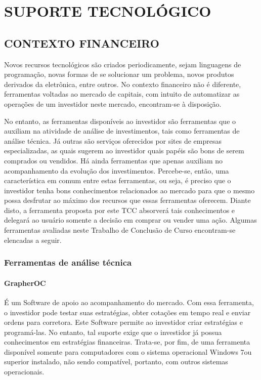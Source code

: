 \chapter[SUPORTE TECNOLOGICO]{SUPORTE TECNOLÓGICO}
\section{CONTEXTO FINANCEIRO}

Novos recursos tecnológicos são criados periodicamente, sejam linguagens de programação, novas formas de se solucionar um problema, novos produtos derivados da eletrônica, entre outros. No contexto financeiro não é diferente, ferramentas voltadas ao mercado de capitais, com intuito de automatizar as operações de um investidor neste mercado, encontram-se à disposição.

No entanto, as ferramentas disponíveis ao investidor são ferramentas que o auxiliam na atividade de análise de investimentos, tais como ferramentas de análise técnica. Já outras são serviços oferecidos por sites de empresas especializadas, as quais sugerem ao investidor quais papéis são bons de serem comprados ou vendidos. Há ainda ferramentas que apenas auxiliam no acompanhamento da evolução dos investimentos. Percebe-se, então, uma característica em comum entre estas ferramentas, ou seja, é preciso que o investidor tenha bons conhecimentos relacionados ao mercado para que o mesmo possa desfrutar ao máximo dos recursos que essas ferramentas oferecem. Diante disto, a ferramenta proposta por este TCC absorverá tais conhecimentos e delegará ao usuário somente a decisão em comprar ou vender uma ação. Algumas ferramentas avaliadas neste Trabalho de Conclusão de Curso encontram-se elencadas a seguir.

\subsection{Ferramentas de análise técnica}

\subsubsection{GrapherOC}

É um Software de apoio ao acompanhamento do mercado. Com essa ferramenta, o investidor pode testar suas estratégias, obter cotações em tempo real e enviar ordens para corretora. Este Software permite ao investidor criar estratégias e programá-las. No entanto, tal suporte exige que o investidor já possua conhecimentos em estratégias financeiras. Trata-se, por fim, de uma ferramenta disponível somente para computadores com o sistema operacional Windows 7\textregistered ou superior instalado, não sendo compatível, portanto, com outros sistemas operacionais.

